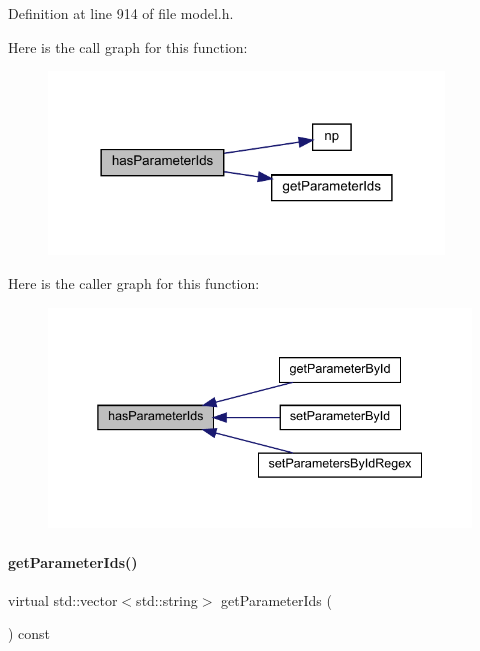 Definition at line 914 of file model.\+h.

Here is the call graph for this function\+:
\nopagebreak
\begin{figure}[H]
\begin{center}
\leavevmode
\includegraphics[width=298pt]{classamici_1_1_model_a216de46b6ca89c0bcc4f1c1418d2c06a_cgraph}
\end{center}
\end{figure}
Here is the caller graph for this function\+:
\nopagebreak
\begin{figure}[H]
\begin{center}
\leavevmode
\includegraphics[width=338pt]{classamici_1_1_model_a216de46b6ca89c0bcc4f1c1418d2c06a_icgraph}
\end{center}
\end{figure}
\mbox{\label{classamici_1_1_model_ad5647cbe7c4989a7692955cbdbf5b3cd}} 
\paragraph{\texorpdfstring{get\+Parameter\+Ids()}{getParameterIds()}}
{\footnotesize\ttfamily virtual std\+::vector$<$std\+::string$>$ get\+Parameter\+Ids (\begin{DoxyParamCaption}{ }\end{DoxyParamCaption}) const\hspace{0.3cm}{\ttfamily [virtual]}}

